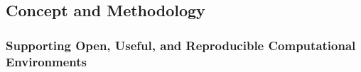 
\subsection{Concept and Methodology}\label{sec:concept_methodology}


%
%
%
%

\subsubsection{Supporting Open, Useful, and Reproducible Computational
  Environments}\label{sec:SOURCE}

